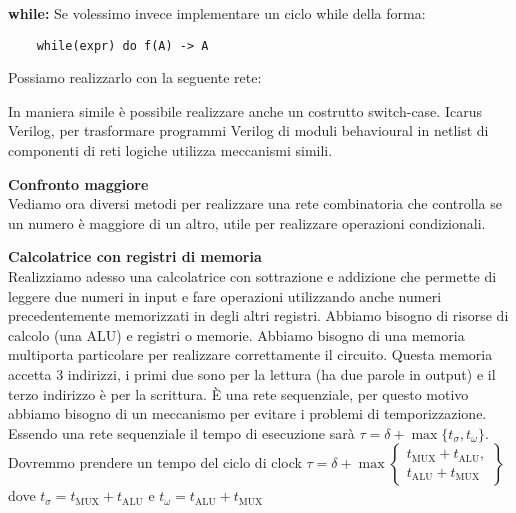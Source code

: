 \begin{defn}
	\textbf{while:}
	Se volessimo invece implementare un ciclo while della forma:
	\begin{Verbatim}
	while(expr) do f(A) -> A
	\end{Verbatim}
	Possiamo realizzarlo con la seguente rete:
	

	In maniera simile è possibile realizzare anche un costrutto switch-case.
	Icarus Verilog, per trasformare programmi Verilog di moduli behavioural in
	netlist di componenti di reti logiche utilizza meccanismi simili.
\end{defn}

\begin{exrc}
	\textbf{Confronto maggiore} \\

	Vediamo ora diversi metodi per realizzare una rete combinatoria che
	controlla se un numero è maggiore di un altro, utile per realizzare
	operazioni condizionali.

	
	\FloatBarrier
\end{exrc}


\begin{exrc}
	\textbf{Calcolatrice con registri di memoria} \\
	
	Realizziamo adesso una calcolatrice con sottrazione e addizione che permette di
	leggere due numeri in input e fare operazioni utilizzando anche numeri
	precedentemente memorizzati in degli altri registri. Abbiamo bisogno di risorse
	di calcolo (una ALU) e registri o memorie. Abbiamo bisogno di una memoria
	multiporta particolare per realizzare correttamente il circuito. Questa memoria
	accetta 3 indirizzi, i primi due sono per la lettura (ha due parole in output) e
	il terzo indirizzo è per la scrittura. È una rete sequenziale, per questo motivo
	abbiamo bisogno di un meccanismo per evitare i problemi di temporizzazione.
	Essendo una rete sequenziale il tempo di esecuzione sarà $ \tau = \delta +
	\max\{t_\sigma, t_\omega\} $. Dovremmo prendere un tempo del ciclo di clock $
	\tau = \delta + \max \left\{\begin{matrix} t_\text{MUX} + t_\text{ALU}, \\
	t_\text{ALU} + t_\text{MUX} \end{matrix}\right\} $ dove $ t_\sigma =
	t_\text{MUX} + t_\text{ALU} $ e $ t_\omega = t_\text{ALU} + t_\text{MUX} $
	
\end{exrc}


